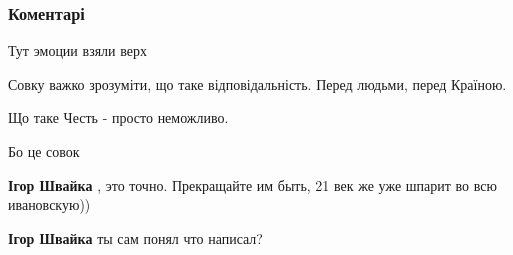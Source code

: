  
 
 
 
 
\subsubsection{Коментарі}

\begin{itemize}
 
Тут эмоции взяли верх

 

Совку важко зрозуміти, що таке відповідальність. Перед людьми, перед Країною.

Що таке Честь - просто неможливо.

Бо це совок 🙏

\begin{itemize}
 
\textbf{Ігор Швайка} , это точно.
Прекращайте им быть, 21 век же уже шпарит во всю ивановскую))

 
\textbf{Ігор Швайка} ты сам понял что написал?

 


\end{itemize}
\end{itemize}
